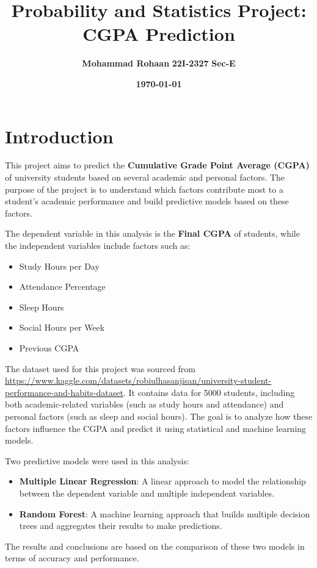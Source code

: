 \documentclass{article}
\title{\textbf{Probability and Statistics Project: CGPA Prediction}}  %
\author{\textbf{\Large Mohammad Rohaan} \hspace{2cm} \Large \textbf{22I-2327} \hspace{2cm} \Large \textbf{Sec-E}}  %
\date{\LARGE \textbf{\today}}  %
\begin{document}
\maketitle  %

\section{Introduction}

This project aims to predict the \textbf{Cumulative Grade Point Average (CGPA)} of university students based on several academic and personal factors. The purpose of the project is to understand which factors contribute most to a student's academic performance and build predictive models based on these factors.

The dependent variable in this analysis is the \textbf{Final CGPA} of students, while the independent variables include factors such as:

\begin{itemize}
    \item Study Hours per Day
    \item Attendance Percentage
    \item Sleep Hours
    \item Social Hours per Week
    \item Previous CGPA
\end{itemize}

The dataset used for this project was sourced from \url{https://www.kaggle.com/datasets/robiulhasanjisan/university-student-performance-and-habits-dataset}. It contains data for 5000 students, including both academic-related variables (such as study hours and attendance) and personal factors (such as sleep and social hours). The goal is to analyze how these factors influence the CGPA and predict it using statistical and machine learning models.

Two predictive models were used in this analysis:
\begin{itemize}
    \item \textbf{Multiple Linear Regression}: A linear approach to model the relationship between the dependent variable and multiple independent variables.
    \item \textbf{Random Forest}: A machine learning approach that builds multiple decision trees and aggregates their results to make predictions.
\end{itemize}

The results and conclusions are based on the comparison of these two models in terms of accuracy and performance.
\end{document}
